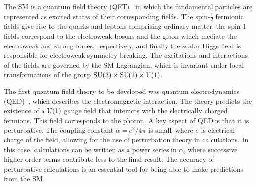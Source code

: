 The SM is a quantum field theory (QFT)~\cite{1995.Weinberg, 1995.Peskin} in which the fundamental particles are represented as excited states of their corresponding fields.
The spin-$\frac{1}{2}$ fermionic fields give rise to the quarks and leptons comprising ordinary matter, the spin-1 fields correspond to the electroweak bosons and the gluon which mediate the electroweak and strong forces, respectively, and finally the scalar Higgs field is responsible for electroweak symmetry breaking.
The excitations and interactions of the fields are governed by the SM Lagrangian, which is invariant under local transformations of the group $\textrm{SU}(3)\times\textrm{SU}(2)\times\textrm{U}(1)$.

The first quantum field theory to be developed was quantum electrodynamics (QED)~\cite{1950.Feynman.QED}, which describes the electromagnetic interaction.
The theory predicts the existence of a $\textrm{U}(1)$ gauge field that interacts with the electrically charged fermions.
This field corresponds to the photon.
A key aspect of QED is that it is perturbative.
The coupling constant $\alpha = e^2/4\pi$ is small, where $e$ is electrical charge of the field, allowing for the use of perturbation theory in calculations.
In this case, calculations can be written as a power series in $\alpha$, where successive higher order terms contribute less to the final result.
The accuracy of perturbative calculations is an essential tool for being able to make predictions from the SM.

